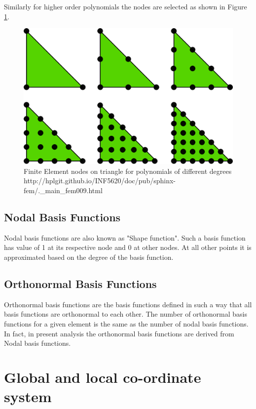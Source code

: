 \documentclass[a4paper,12pt]{book}
\begin{document}
Similarly for higher order polynomials the nodes are selected as shown in Figure \ref{fig:Nodes on Triangular Element}.

\begin{figure}
  \includegraphics[width=\linewidth]{fem_triangle_2.png}
  \caption{Finite Element nodes on triangle for polynomials of different degrees \\ http://hplgit.github.io/INF5620/doc/pub/sphinx-fem/.\_main\_fem009.html}
  \label{fig:Nodes on Triangular Element}
\end{figure}

\subsection{Nodal Basis Functions}

Nodal basis functions are also known as "Shape function". Such a basis function has value of 1 at its respective node and 0 at other nodes. At all other points it is approximated based on the degree of the basis function. 

\subsection{Orthonormal Basis Functions}

Orthonormal basis functions are the basis functions defined in such a way that all basis functions are orthonormal to each other. The number of orthonormal basis functions for a given element is the same as the number of nodal basis functions. In fact, in present analysis the orthonormal basis functions are derived from Nodal basis functions.

\section{Global and local co-ordinate system}
\end{document}
